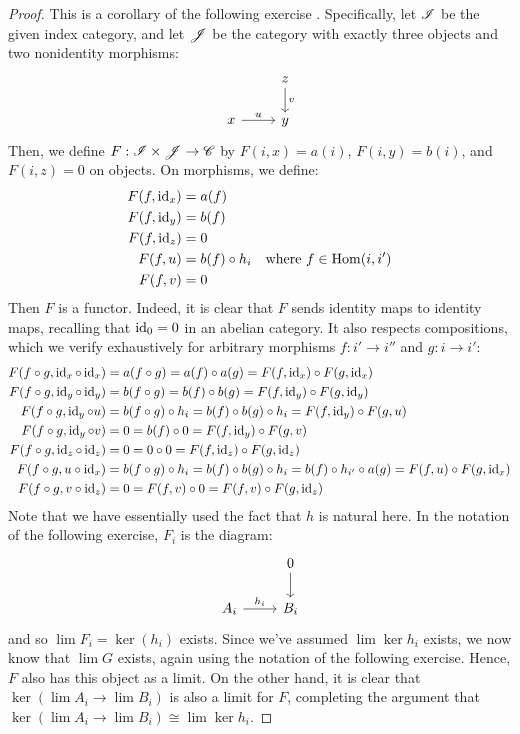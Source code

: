 \documentclass[12pt]{exam}
\begin{document}
\begin{proof}
	This is a corollary of the following exercise . Specifically, let $\mathscr{I}$ be the given index category, and let $\mathscr{J}$ be the category with exactly three objects and two nonidentity morphisms:
	\[ \begin{tikzcd} & z \arrow[d,"v"] \\ x \arrow[r,"u"] & y \end{tikzcd} \]
	Then, we define $F : \mathscr{I} \times \mathscr{J} \to \mathscr{C}$ by $F(i,x) = a(i)$, $F(i,y) = b(i)$, and $F(i,z) = 0$ on objects. On morphisms, we define:
	\begin{align*}
		F(f,\operatorname{id}_x) &= a(f) \\
		F(f,\operatorname{id}_y) &= b(f) \\
		F(f,\operatorname{id}_z) &= 0 \\
		F(f,u) &= b(f) \circ h_i & \text{where }f \in \operatorname{Hom}(i,i') \\
		F(f,v) &= 0 \\
	\end{align*}
	Then $F$ is a functor. Indeed, it is clear that $F$ sends identity maps to identity maps, recalling that $\operatorname{id}_0 = 0$ in an abelian category. It also respects compositions, which we verify exhaustively for arbitrary morphisms $f : i' \to i''$ and $g : i \to i'$:
	\begin{align*}
		F(f \circ g,\operatorname{id}_x \circ \operatorname{id}_x) &= a(f \circ g) = a(f) \circ a(g) = F(f,\operatorname{id}_x) \circ F(g,\operatorname{id}_x) \\
		F(f \circ g,\operatorname{id}_y \circ \operatorname{id}_y) &= b(f \circ g) = b(f) \circ b(g) = F(f,\operatorname{id}_y) \circ F(g,\operatorname{id}_y) \\
		F(f \circ g,\operatorname{id}_y \circ u) &= b(f \circ g) \circ h_i = b(f) \circ b(g) \circ h_i = F(f,\operatorname{id}_y) \circ F(g,u) \\
		F(f \circ g,\operatorname{id}_y \circ v) &= 0 = b(f) \circ 0 = F(f,\operatorname{id}_y) \circ F(g,v) \\
		F(f \circ g,\operatorname{id}_z \circ \operatorname{id}_z) &= 0 = 0 \circ 0 = F(f,\operatorname{id}_z) \circ F(g,\operatorname{id}_z) \\
		F(f \circ g,u \circ \operatorname{id}_x) &= b(f \circ g) \circ h_i = b(f) \circ b(g) \circ h_i = b(f) \circ h_{i'} \circ a(g) = F(f,u) \circ F(g,\operatorname{id}_x) \\
		F(f \circ g,v \circ \operatorname{id}_z) &= 0 = F(f,v) \circ 0 = F(f,v) \circ F(g,\operatorname{id}_z)
	\end{align*}
	Note that we have essentially used the fact that $h$ is natural here. In the notation of the following exercise, $F_i$ is the diagram:
	\[ \begin{tikzcd} & 0 \arrow[d] \\ A_i \arrow[r,"h_i"] & B_i \end{tikzcd} \]
	and so $\lim F_i = \ker(h_i)$ exists. Since we've assumed $\lim \ker h_i$ exists, we now know that $\lim G$ exists, again using the notation of the following exercise. Hence, $F$ also has this object as a limit. On the other hand, it is clear that $\ker(\lim A_i \to \lim B_i)$ is also a limit for $F$, completing the argument that $\ker(\lim A_i \to \lim B_i) \cong \lim \ker h_i$.
\end{proof}
\end{document}
